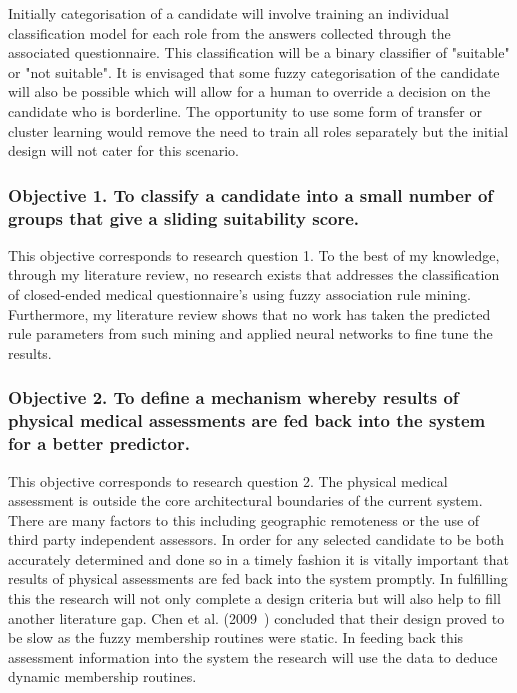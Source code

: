 Initially categorisation of a candidate will involve training an individual classification model for each role from
the answers collected through the associated questionnaire. This classification will be a binary classifier
of "suitable" or "not suitable". It is envisaged that some fuzzy categorisation of the candidate will also be
possible which will allow for a human to override a decision on the candidate who is borderline. The opportunity
to use some form of transfer or cluster learning would remove the need to train all roles separately but the initial
design will not cater for this scenario.

\subsubsection{Objective 1. To classify a candidate into a small number of groups that give a sliding suitability score.}

This objective corresponds to research question 1. To the best of my knowledge, through my literature review, no research exists that addresses the classification of closed-ended medical questionnaire's using fuzzy association rule mining. Furthermore, my literature review shows that no work has taken the predicted rule parameters from such mining and applied neural networks to fine tune the results.

\subsubsection{Objective 2. To define a mechanism whereby results of physical medical assessments are fed back into the system for a better predictor.}

This objective corresponds to research question 2. The physical medical assessment is outside the core architectural boundaries of the current system. There are many factors to this including geographic remoteness or the use of third party independent assessors. In order for any selected candidate to be both accurately determined and done so in a timely fashion it is vitally important that results of physical assessments are fed back into the system promptly. In fulfilling this the research will not only complete a design criteria but will also help to fill another literature gap. Chen et al. (2009~\cite{chen2009mining}) concluded that their design proved to be slow as the fuzzy membership routines were static. In feeding back this assessment information into the system the research will use the data to deduce dynamic membership routines.


